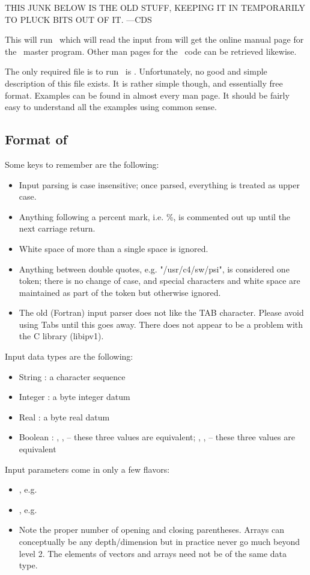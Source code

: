 THIS JUNK BELOW IS THE OLD STUFF, KEEPING IT IN TEMPORARILY TO PLUCK
BITS OUT OF IT. ---CDS

This will run \PSIthree\, which will read the input from 
will get the online manual page for the \PSIdriver\ master program.
Other man pages for the \PSIdriver\ code can be retrieved likewise.

The only required file is to run \PSIthree\ is . 
Unfortunately, no good and simple description of this
file exists. It is rather simple though, and essentially
free format. Examples can be found in
almost every man page. It should be fairly easy to
understand all the examples using common sense. 

\subsection{Format of }
Some keys to remember are the following: 
\begin{itemize}
\item Input parsing is case insensitive; once parsed, everything is treated as upper case. 
\item Anything following a percent mark, i.e. \%, is commented out up until the next carriage return. 
\item White space of more than a single space is ignored. 
\item Anything between double quotes, e.g. "/usr/c4/sw/psi", 
is considered one token; there is no change of case, and special 
characters and white space are maintained as part of the token 
but  otherwise ignored. 
\item The old (Fortran) input parser does not like the TAB character.
Please avoid using Tabs until this goes away.  There does not appear
to be a problem with the C library (libipv1).
\end{itemize}
Input data types are the following: 
\begin{itemize}
\item String : a character sequence 
\item Integer : a  byte integer datum 
\item Real : a  byte real datum 
\item Boolean : , ,  -- these three values are equivalent;
, ,  -- these three values are equivalent 
\end{itemize}
Input parameters come in only a few flavors: 
\begin{itemize}
\item {}, e.g.  
\item {}, e.g. 
\item {}
Note the proper number of opening and closing parentheses. Arrays can 
conceptually be any depth/dimension but in practice never go
much beyond level 2. The elements of vectors and arrays 
need not be of the same data type. 
\end{itemize}

